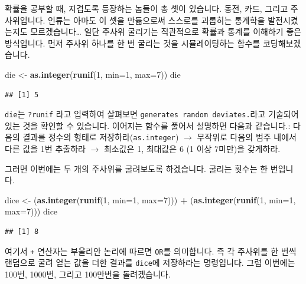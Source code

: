 \documentclass[]{book}
\newenvironment{Shaded}{\begin{snugshade}}{\end{snugshade}}
\newcommand{\DataTypeTok}[1]{\textcolor[rgb]{0.13,0.29,0.53}{#1}}
\newcommand{\DecValTok}[1]{\textcolor[rgb]{0.00,0.00,0.81}{#1}}
\newcommand{\KeywordTok}[1]{\textcolor[rgb]{0.13,0.29,0.53}{\textbf{#1}}}
\newcommand{\NormalTok}[1]{#1}
\newcommand{\OperatorTok}[1]{\textcolor[rgb]{0.81,0.36,0.00}{\textbf{#1}}}
\newcommand{\StringTok}[1]{\textcolor[rgb]{0.31,0.60,0.02}{#1}}
\begin{document}
확률을 공부할 때, 지겹도록 등장하는 놈들이 총 셋이 있습니다. 동전, 카드, 그리고 주사위입니다. 인류는 아마도 이 셋을 만듦으로써 스스로를 괴롭히는 통계학을 발전시켰는지도 모르겠습니다\ldots{} 일단 주사위 굴리기는 직관적으로 확률과 통계를 이해하기 좋은 방식입니다. 먼저 주사위 하나를 한 번 굴리는 것을 시뮬레이팅하는 함수를 코딩해보겠습니다.

\begin{Shaded}
\begin{Highlighting}[]
\NormalTok{die <-}\StringTok{ }\KeywordTok{as.integer}\NormalTok{(}\KeywordTok{runif}\NormalTok{(}\DecValTok{1}\NormalTok{, }\DataTypeTok{min=}\DecValTok{1}\NormalTok{, }\DataTypeTok{max=}\DecValTok{7}\NormalTok{))}
\NormalTok{die}
\end{Highlighting}
\end{Shaded}

\begin{verbatim}
## [1] 5
\end{verbatim}

\texttt{die}는 \texttt{?runif} 라고 입력하여 살펴보면 \texttt{generates\ random\ deviates.}라고 기술되어 있는 것을 확인할 수 있습니다. 이어지는 함수를 풀어서 설명하면 다음과 같습니다.: 다음의 결과를 정수의 형태로 저장하라(\texttt{as.integer}) \(\rightarrow\) 무작위로 다음의 범주 내에서 다른 값을 1번 추출하라 \(\rightarrow\) 최소값은 1, 최대값은 6 (1 이상 7미만)을 갖게하라.

그러면 이번에는 두 개의 주사위를 굴려보도록 하겠습니다. 굴리는 횟수는 한 번입니다.

\begin{Shaded}
\begin{Highlighting}[]
\NormalTok{dice <-}\StringTok{ }\NormalTok{(}\KeywordTok{as.integer}\NormalTok{(}\KeywordTok{runif}\NormalTok{(}\DecValTok{1}\NormalTok{, }\DataTypeTok{min=}\DecValTok{1}\NormalTok{, }\DataTypeTok{max=}\DecValTok{7}\NormalTok{))) }\OperatorTok{+}
\StringTok{  }\NormalTok{(}\KeywordTok{as.integer}\NormalTok{(}\KeywordTok{runif}\NormalTok{(}\DecValTok{1}\NormalTok{, }\DataTypeTok{min=}\DecValTok{1}\NormalTok{, }\DataTypeTok{max=}\DecValTok{7}\NormalTok{)))}
\NormalTok{dice}
\end{Highlighting}
\end{Shaded}

\begin{verbatim}
## [1] 8
\end{verbatim}

여기서 \texttt{+} 연산자는 부울리안 논리에 따르면 \texttt{OR}를 의미합니다. 즉 각 주사위를 한 번씩 랜덤으로 굴려 얻는 값을 더한 결과를 \texttt{dice}에 저장하라는 명령입니다. 그럼 이번에는 100번, 1000번, 그리고 100만번을 돌려겠습니다.
\end{document}
